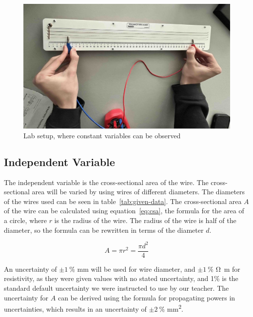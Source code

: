 \documentclass{article}
\makeatletter
\newcommand{\punc}[2]{\(\pm\SI{#1}{\percent}\) \si{#2}}
\newcommand{\todo}[1]{{\color{red}{\footnotesize[TODO:\@ #1]}}}
\makeatother
\begin{document}
\begin{figure}[H]
  \medskip
  \centering
  \includegraphics[width=1\linewidth]{lab-setup}
  \caption{Lab setup, where constant variables can be observed}\label{fig:lab-setup}
\end{figure}

\subsection{Independent Variable}

The independent variable is the cross-sectional area of the wire. The cross-sectional area will be varied by using wires of different diameters. The diameters of the wires used can be seen in table~\ref{tab:given-data}. The cross-sectional area \(A\) of the wire can be calculated using equation~\ref{eq:csa}, the formula for the area of a circle, where \(r\) is the radius of the wire. The radius of the wire is half of the diameter, so the formula can be rewritten in terms of the diameter \(d\).

\begin{equation}\label{eq:csa}
  A = \pi r^2 = \frac{\pi d^2}{4}
\end{equation}

An uncertainty of \punc{1}{\milli\metre} will be used for wire diameter, and \punc{1}{\ohm\metre} for resistivity, as they were given values with no stated uncertainty, and 1\% is the standard default uncertainty we were instructed to use by our teacher. The uncertainty for \(A\) can be derived using the formula for propagating powers in uncertainties, which results in an uncertainty of \punc{2}{\milli\metre\squared}.

\todo{Explain how the uncertainty for CSA was calculated}
\end{document}
